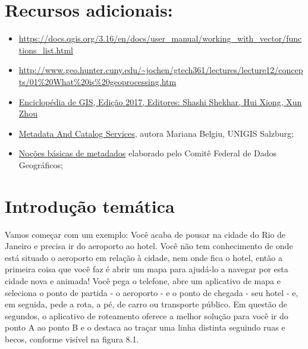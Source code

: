 \documentclass[
]{book}
\providecommand{\tightlist}{%
  \setlength{\itemsep}{0pt}\setlength{\parskip}{0pt}}
\begin{document}
\hypertarget{recursos-adicionais-8}{%
\section{Recursos adicionais:}\label{recursos-adicionais-8}}

\begin{itemize}
\tightlist
\item
  \href{https://docs.qgis.org/3.16/en/docs/user_manual/\%20working_with_vector/functions_list.html}{https://docs.qgis.org/3.16/en/docs/user\_manual/working\_with\_vector/functions\_list.html}
\item
  \href{http://www.\%20geo.hunter.cuny.edu/~jochen/gtech361/lectures/lecture12/concepts/01\%20What\%20is\%20geoprocessing.htm}{http://www.geo.hunter.cuny.edu/\textasciitilde jochen/gtech361/lectures/lecture12/concepts/01\%20What\%20is\%20geoprocessing.htm}
\item
  \href{https://link.springer.com/referencework/10.1007/978-3-319-17885-1}{Enciclopédia de GIS, Edição 2017, Editores: Shashi Shekhar, Hui Xiong, Xun Zhou}{ }
\item
  \href{https://www.geo-train.eu/modules/metadata/pdf/Metadata.pdf}{Metadata And Catalog Services}, autora Mariana Belgiu, UNIGIS Salzburg;
\item
  \href{https://www.fgdc.gov/resources/factsheets/documents/GeospatialMetadata-July2011.pdf}{Noções básicas de metadados} elaborado pelo Comitê Federal de Dados Geográficos;
\end{itemize}

\hypertarget{introduuxe7uxe3o-temuxe1tica-8}{%
\section{Introdução temática}\label{introduuxe7uxe3o-temuxe1tica-8}}

Vamos começar com um exemplo: Você acaba de pousar na cidade do Rio de Janeiro e precisa ir do aeroporto ao hotel. Você não tem conhecimento de onde está situado o aeroporto em relação à cidade, nem onde fica o hotel, então a primeira coisa que você faz é abrir um mapa para ajudá-lo a navegar por esta cidade nova e animada! Você pega o telefone, abre um aplicativo de mapa e seleciona o ponto de partida - o aeroporto - e o ponto de chegada - seu hotel - e, em seguida, pede a rota, a pé, de carro ou transporte público. Em questão de segundos, o aplicativo de roteamento oferece a melhor solução para você ir do ponto A ao ponto B e o destaca ao traçar uma linha distinta seguindo ruas e becos, conforme visível na figura 8.1.
\end{document}
